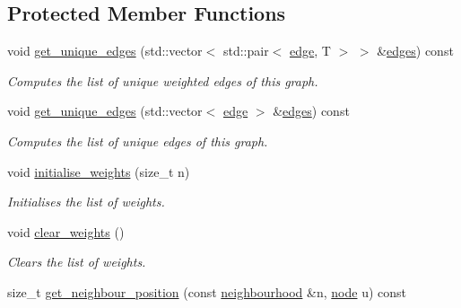 \subsection*{Protected Member Functions}
\begin{DoxyCompactItemize}
\item 
void \hyperlink{classlgraph_1_1wdgraph_a1b290b91e69ad2c6f667244763f7d709}{get\+\_\+unique\+\_\+edges} (std\+::vector$<$ std\+::pair$<$ \hyperlink{namespacelgraph_a76bd7d50719f03de7a85db259d80d572}{edge}, T $>$ $>$ \&\hyperlink{classlgraph_1_1wxgraph_a1b89f56544185e33d54e72a8ed19a789}{edges}) const
\begin{DoxyCompactList}\small\item\em Computes the list of unique weighted edges of this graph. \end{DoxyCompactList}\item 
void \hyperlink{classlgraph_1_1wdgraph_a291ce640bc2273ab23d3d8a545476e7a}{get\+\_\+unique\+\_\+edges} (std\+::vector$<$ \hyperlink{namespacelgraph_a76bd7d50719f03de7a85db259d80d572}{edge} $>$ \&\hyperlink{classlgraph_1_1wxgraph_a1b89f56544185e33d54e72a8ed19a789}{edges}) const
\begin{DoxyCompactList}\small\item\em Computes the list of unique edges of this graph. \end{DoxyCompactList}\item 
\mbox{\label{classlgraph_1_1wxgraph_a3d0eed0195489df5db3e9383a5c91344}} 
void \hyperlink{classlgraph_1_1wxgraph_a3d0eed0195489df5db3e9383a5c91344}{initialise\+\_\+weights} (size\+\_\+t n)
\begin{DoxyCompactList}\small\item\em Initialises the list of weights. \end{DoxyCompactList}\item 
\mbox{\label{classlgraph_1_1wxgraph_a805868af4e350ccb6a4555cff3822d22}} 
void \hyperlink{classlgraph_1_1wxgraph_a805868af4e350ccb6a4555cff3822d22}{clear\+\_\+weights} ()
\begin{DoxyCompactList}\small\item\em Clears the list of weights. \end{DoxyCompactList}\item 
size\+\_\+t \hyperlink{classlgraph_1_1xxgraph_abb0c474cb162940aba3439124c1202d7}{get\+\_\+neighbour\+\_\+position} (const \hyperlink{namespacelgraph_a052e7766c13f3a43cec0aec8173fdede}{neighbourhood} \&n, \hyperlink{namespacelgraph_a397169dd66adf725210a30fb7251773e}{node} u) const

\end{DoxyCompactItemize}
